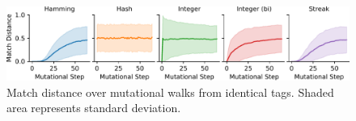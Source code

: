 \begin{figure}
\vspace{100ex}
\begin{center}
\includegraphics[width=\textwidth]{img/mutational_walk/bitweight=0dot5+seed=1+title=mutational_walk_lineplot+_data_hathash_hash=8bf152d87daa9cb7+_script_fullcat_hash=982405ca713eba73+ext=}
\caption{
Match distance over mutational walks from identical tags.
Shaded area represents standard deviation.
}
\label{fig:mutational_walk_lineplot}

\end{center}
\end{figure}
